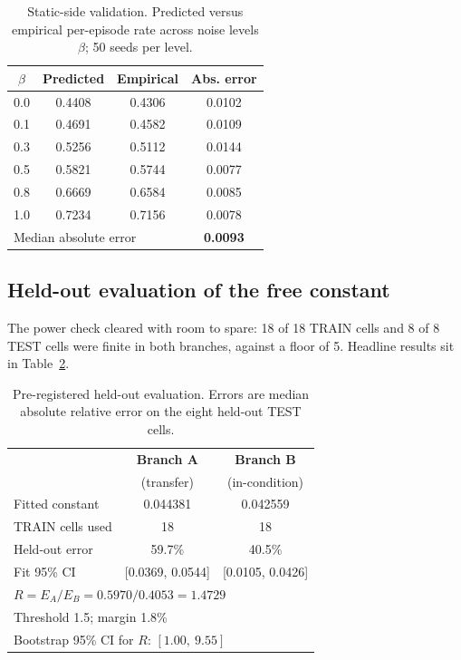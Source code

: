 \documentclass[conference]{IEEEtran}
\begin{document}
\begin{table}[t]
\centering
\caption{Static-side validation. Predicted versus empirical per-episode
rate across noise levels $\beta$; 50 seeds per level.}
\label{tab:static}
\footnotesize
\begin{tabular}{cccc}
\hline
$\beta$ & Predicted & Empirical & Abs. error \\
\hline
0.0 & 0.4408 & 0.4306 & 0.0102 \\
0.1 & 0.4691 & 0.4582 & 0.0109 \\
0.3 & 0.5256 & 0.5112 & 0.0144 \\
0.5 & 0.5821 & 0.5744 & 0.0077 \\
0.8 & 0.6669 & 0.6584 & 0.0085 \\
1.0 & 0.7234 & 0.7156 & 0.0078 \\
\hline
\multicolumn{3}{l}{Median absolute error} & \textbf{0.0093} \\
\hline
\end{tabular}
\end{table}

\subsection{Held-out evaluation of the free constant}

The power check cleared with room to spare: 18 of 18 TRAIN cells and 8 of
8 TEST cells were finite in both branches, against a floor of 5. Headline
results sit in Table~\ref{tab:kappa}.

\begin{table}[t]
\centering
\caption{Pre-registered held-out evaluation. Errors are median absolute
relative error on the eight held-out TEST cells.}
\label{tab:kappa}
\footnotesize
\begin{tabular}{lcc}
\hline
 & \textbf{Branch A} & \textbf{Branch B} \\
 & (transfer) & (in-condition) \\
\hline
Fitted constant & 0.044381 & 0.042559 \\
TRAIN cells used & 18 & 18 \\
Held-out error & 59.7\% & 40.5\% \\
Fit 95\% CI & [0.0369, 0.0544] & [0.0105, 0.0426] \\
\hline
\multicolumn{3}{l}{$R = E_A/E_B = 0.5970/0.4053 = \mathbf{1.4729}$} \\
\multicolumn{3}{l}{Threshold 1.5; margin 1.8\%} \\
\multicolumn{3}{l}{Bootstrap 95\% CI for $R$: $[1.00,\ 9.55]$} \\
\hline
\end{tabular}
\end{table}
\end{document}
